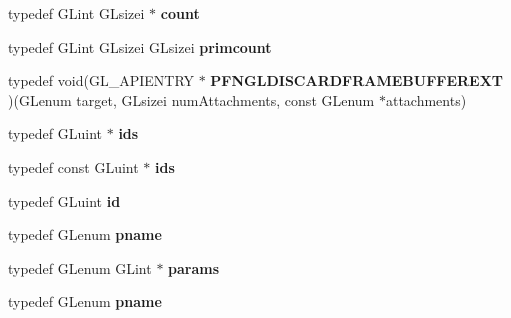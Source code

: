 \begin{DoxyCompactItemize}
\item 
\hypertarget{class_c_p_v_r_tgles2_ext_aa0aecf84f1eef2e9121c19d6ae1510c6}{typedef G\+Lint G\+Lsizei $\ast$ {\bfseries count}}\label{class_c_p_v_r_tgles2_ext_aa0aecf84f1eef2e9121c19d6ae1510c6}

\item 
\hypertarget{class_c_p_v_r_tgles2_ext_a1e2676ff43b5c3f0d2b4aa844bfda60a}{typedef G\+Lint G\+Lsizei G\+Lsizei {\bfseries primcount}}\label{class_c_p_v_r_tgles2_ext_a1e2676ff43b5c3f0d2b4aa844bfda60a}

\item 
\hypertarget{class_c_p_v_r_tgles2_ext_ace5214d738b73c9c8a93a3f3da3f925d}{typedef void(G\+L\+\_\+\+A\+P\+I\+E\+N\+T\+R\+Y $\ast$ {\bfseries P\+F\+N\+G\+L\+D\+I\+S\+C\+A\+R\+D\+F\+R\+A\+M\+E\+B\+U\+F\+F\+E\+R\+E\+X\+T} )(G\+Lenum target, G\+Lsizei num\+Attachments, const G\+Lenum $\ast$attachments)}\label{class_c_p_v_r_tgles2_ext_ace5214d738b73c9c8a93a3f3da3f925d}

\item 
\hypertarget{class_c_p_v_r_tgles2_ext_a2439a4737b501f3e3c5a4fce362480e9}{typedef G\+Luint $\ast$ {\bfseries ids}}\label{class_c_p_v_r_tgles2_ext_a2439a4737b501f3e3c5a4fce362480e9}

\item 
\hypertarget{class_c_p_v_r_tgles2_ext_a7265d042869a595d4ecedfeff86b6029}{typedef const G\+Luint $\ast$ {\bfseries ids}}\label{class_c_p_v_r_tgles2_ext_a7265d042869a595d4ecedfeff86b6029}

\item 
\hypertarget{class_c_p_v_r_tgles2_ext_a1fb8013894798749ca13f14c147ebb5f}{typedef G\+Luint {\bfseries id}}\label{class_c_p_v_r_tgles2_ext_a1fb8013894798749ca13f14c147ebb5f}

\item 
\hypertarget{class_c_p_v_r_tgles2_ext_abe6ce849d1992a8c0f1f8ec29aa5b00d}{typedef G\+Lenum {\bfseries pname}}\label{class_c_p_v_r_tgles2_ext_abe6ce849d1992a8c0f1f8ec29aa5b00d}

\item 
\hypertarget{class_c_p_v_r_tgles2_ext_aa59bb807b80eb34f828e00561004f121}{typedef G\+Lenum G\+Lint $\ast$ {\bfseries params}}\label{class_c_p_v_r_tgles2_ext_aa59bb807b80eb34f828e00561004f121}

\item 
\hypertarget{class_c_p_v_r_tgles2_ext_abe6ce849d1992a8c0f1f8ec29aa5b00d}{typedef G\+Lenum {\bfseries pname}}\label{class_c_p_v_r_tgles2_ext_abe6ce849d1992a8c0f1f8ec29aa5b00d}


\end{DoxyCompactItemize}
